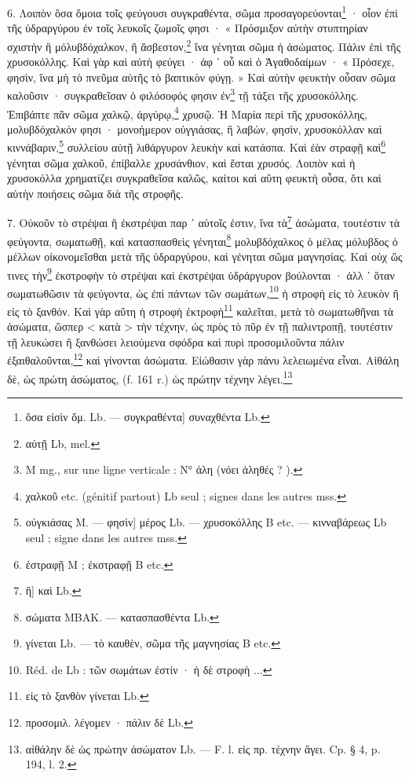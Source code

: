 \documentclass[a4paper, 11pt, oneside, polutonikogreek, french]{article}
\begin{document}
6. Λοιπὸν ὅσα ὅμοια τοῖς φεύγουσι συγκραθέντα, σῶμα προσαγορεύονται\footnote{ὅσα εἰσὶν ὅμ. Lb. --- συγκραθέντα] συναχθέντα Lb.} · οἷον ἐπὶ τῆς ὑδραργύρου ἐν τοῖς λευκοῖς ζωμοῖς φησι · « Πρόσμιξον αὐτὴν στυπτηρίαν σχιστὴν ἢ μόλυβδόχαλκον, ἢ ἄσβεστον,\footnote{αὐτῇ Lb, mel.} ἵνα γένηται σῶμα ἡ ἀσώματος. Πάλιν ἐπὶ τῆς χρυσοκόλλης. Καὶ γὰρ καὶ αὐτὴ φεύγει · ἀφ ᾽ οὗ καὶ ὁ Ἀγαθοδαίμων · « Πρόσεχε, φησὶν, ἵνα μὴ τὸ πνεῦμα αὐτῆς τὸ βαπτικὸν φύγῃ. » Καὶ αὐτὴν φευκτὴν οὖσαν σῶμα καλοῦσιν · συγκραθεῖσαν ὁ φιλόσοφός φησιν ἐν\footnote{M mg., sur une ligne verticale : N° ἀλη (νόει ἀληθές ? ).} τῇ τάξει τῆς χρυσοκόλλης. Ἐπιβάπτε πᾶν σῶμα χαλκῷ, ἀργύρῳ,\footnote{χαλκοῦ etc. (génitif partout) Lb seul ; signes dans les autres mss.} χρυσῷ. Ἡ Μαρία περὶ τῆς χρυσοκόλλης, μολυβδόχαλκόν φησι · μονοήμερον οὐγγιάσας, ἢ λαβὼν, φησὶν, χρυσοκόλλαν καὶ κιννάβαριν,\footnote{οὐγκιάσας M. --- φησὶν] μέρος Lb. --- χρυσοκόλλης B etc. --- κινναβάρεως Lb seul ; signe dans les autres mss.} συλλείου αὐτῇ λιθάργυρον λευκὴν καὶ κατάσπα. Καὶ ἐὰν στραφῇ καὶ\footnote{ἐστραφῇ M ; ἐκστραφῇ B etc.} γένηται σῶμα χαλκοῦ, ἐπίβαλλε χρυσάνθιον, καὶ ἔσται χρυσός. Λοιπὸν καὶ ἡ χρυσοκόλλα χρηματίζει συγκραθεῖσα καλῶς, καίτοι καὶ αὕτη φευκτὴ οὖσα, ὅτι καὶ αὐτὴν ποιήσεις σῶμα διὰ τῆς στροφῆς.

7. Οὐκοῦν τὸ στρέψαι ἢ ἐκστρέψαι παρ ᾽ αὐτοῖς ἐστιν, ἵνα τὰ\footnote{ἢ] καὶ Lb.} ἀσώματα, τουτέστιν τὰ φεύγοντα, σωματωθῇ, καὶ κατασπασθεὶς γένηται\footnote{σώματα MBAK. --- κατασπασθέντα Lb.} μολυβδόχαλκος ὁ μέλας μόλυβδος ὁ μέλλων οἰκονομεῖσθαι μετὰ τῆς ὑδραργύρου, καὶ γένηται σῶμα μαγνησίας. Καὶ οὐχ ὥς τινες τὴν\footnote{γίνεται Lb. --- τὸ καυθὲν, σῶμα τῆς μαγνησίας B etc.} ἐκστροφὴν τὸ στρέψαι καὶ ἐκστρέψαι ὑδράργυρον βούλονται · ἀλλ ᾽ ὅταν σωματωθῶσιν τὰ φεύγοντα, ὡς ἐπὶ πάντων τῶν σωμάτων,\footnote{Réd. de Lb : τῶν σωμάτων ἐστίν · ἡ δὲ στροφὴ ...} ἡ στροφὴ εἰς τὸ λευκὸν ἢ εἰς τὸ ξανθόν. Καὶ γὰρ αὕτη ἡ στροφὴ ἐκτροφὴ\footnote{εἰς τὸ ξανθὸν γίνεται Lb.} καλεῖται, μετὰ τὸ σωματωθῆναι τὰ ἀσώματα, ὥσπερ < κατὰ > τὴν τέχνην, ὡς πρὸς τὸ πῦρ ἐν τῇ παλιντροπῇ, τουτέστιν τῇ λευκώσει ἢ ξανθώσει λειούμενα σφόδρα καὶ πυρὶ προσομιλοῦντα πάλιν ἐξαιθαλοῦνται,\footnote{προσομιλ. λέγομεν · πάλιν δὲ Lb.} καὶ γίνονται ἀσώματα. Εἰώθασιν γὰρ πάνυ λελειωμένα εἶναι. Αἰθάλη δὲ, ὠς πρώτη ἀσώματος, (f. 161 r.) ὡς πρώτην τέχνην λέγει.\footnote{αἰθάλην δὲ ὡς πρώτην ἀσώματον Lb. --- F. l. εἰς πρ. τέχνην ἄγει. Cp. § 4, p. 194, l. 2.}
\end{document}
